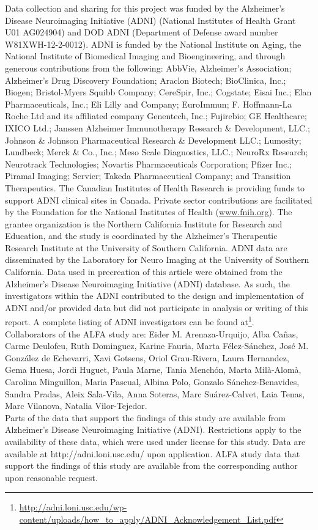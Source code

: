Data collection and sharing for this project was funded by the Alzheimer's Disease Neuroimaging Initiative (ADNI) (National Institutes of Health Grant U01 AG024904) and DOD ADNI (Department of Defense award number W81XWH-12-2-0012). ADNI is funded by the National Institute on Aging, the National Institute of Biomedical Imaging and Bioengineering, and through generous contributions from the following: AbbVie, Alzheimer’s Association; Alzheimer’s Drug Discovery Foundation; Araclon Biotech; BioClinica, Inc.; Biogen; Bristol-Myers Squibb Company; CereSpir, Inc.; Cogstate; Eisai Inc.; Elan Pharmaceuticals, Inc.; Eli Lilly and Company; EuroImmun; F. Hoffmann-La Roche Ltd and its affiliated company Genentech, Inc.; Fujirebio; GE Healthcare; IXICO Ltd.; Janssen Alzheimer Immunotherapy Research {\&} Development, LLC.; Johnson {\&} Johnson Pharmaceutical Research {\&} Development LLC.; Lumosity; Lundbeck; Merck {\&} Co., Inc.; Meso Scale Diagnostics, LLC.; NeuroRx Research; Neurotrack Technologies; Novartis Pharmaceuticals Corporation; Pfizer Inc.; Piramal Imaging; Servier; Takeda Pharmaceutical Company; and Transition Therapeutics. The Canadian Institutes of Health Research is providing funds to support ADNI clinical sites in Canada. Private sector contributions are facilitated by the Foundation for the National Institutes of Health (\url{www.fnih.org}). The grantee organization is the Northern California Institute for Research and Education, and the study is coordinated by the Alzheimer’s Therapeutic Research Institute at the University of Southern California. ADNI data are disseminated by the Laboratory for Neuro Imaging at the University of Southern California. Data used in precreation of this article were obtained from the Alzheimer’s Disease Neuroimaging Initiative (ADNI) database. As such, the investigators within the ADNI contributed to the design and implementation of ADNI and/or provided data but did not participate in analysis or writing of this report. A complete listing of ADNI investigators can be found at\footnote{\url{http://adni.loni.usc.edu/wp-content/uploads/how_to_apply/ADNI_Acknowledgement_List.pdf}}. \\

Collaborators of the ALFA study are: Eider M. Arenaza-Urquijo, Alba Cañas, Carme Deulofeu, Ruth Dominguez, Karine Fauria, Marta Félez-Sánchez, José M. González de Echevarri, Xavi Gotsens, Oriol Grau-Rivera, Laura Hernandez, Gema Huesa, Jordi Huguet, Paula Marne, Tania Menchón, Marta Milà-Alomà, Carolina Minguillon, Maria Pascual, Albina Polo, Gonzalo Sánchez-Benavides, Sandra Pradas, Aleix Sala-Vila, Anna Soteras, Marc Suárez-Calvet, Laia Tenas, Marc Vilanova, Natalia Vilor-Tejedor. \\

Parts of the data that support the findings of this study are available from Alzheimer’s Disease Neuroimaging Initiative (ADNI). Restrictions apply to the availability of these data, which were used under license for this study. Data are available at http://adni.loni.usc.edu/ upon application. ALFA study data that support the findings of this study are available from the corresponding author upon reasonable request. 

